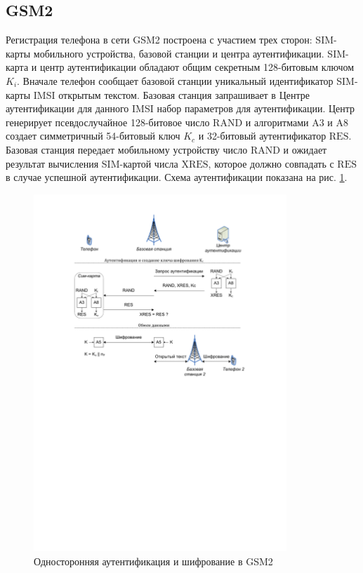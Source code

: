 \subsection{GSM2}

Регистрация телефона в сети GSM2 построена с участием трех сторон: SIM-карты мобильного устройства, базовой станции и центра аутентификации. SIM-карта и центр аутентификации обладают общим секретным 128-битовым ключом $K_i$. Вначале телефон сообщает базовой станции уникальный идентификатор SIM-карты IMSI открытым текстом. Базовая станция запрашивает в Центре аутентификации для данного IMSI набор параметров для аутентификации. Центр генерирует псевдослучайное 128-битовое число $\textrm{RAND}$ и алгоритмами A3 и A8 создает симметричный 54-битовый ключ $K_c$ и 32-битовый аутентификатор $\textrm{RES}$. Базовая станция передает мобильному устройству число $\textrm{RAND}$ и ожидает результат вычисления SIM-картой числа $\textrm{XRES}$, которое должно совпадать с $\textrm{RES}$ в случае успешной аутентификации. Схема аутентификации показана на рис. \ref{fig:gsm2}.

\begin{figure}[h!]
	\centering
	\includegraphics[width=0.85\textwidth]{pic/gsm2}
	\caption{Односторонняя аутентификация и шифрование в GSM2\label{fig:gsm2}}
\end{figure}

